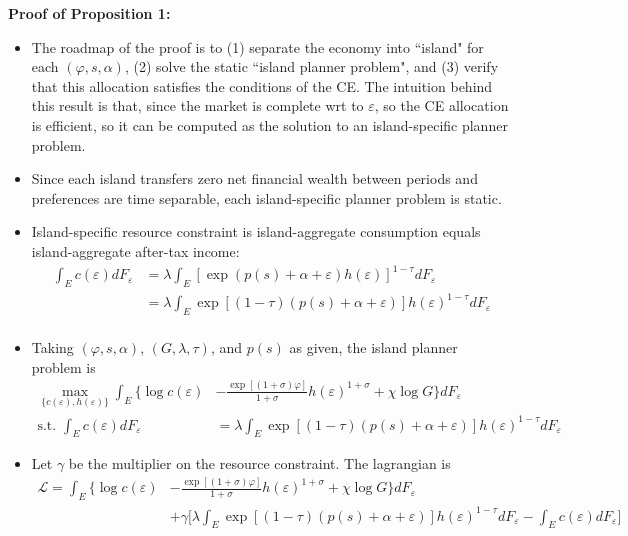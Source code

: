 \documentclass{article}
\newcommand{\Lfn}{\mathcal{L}}
\begin{document}
\bigskip



\textbf{Proof of Proposition 1:} 



\begin{itemize}
\item The roadmap of the proof is to (1) separate the economy into ``island" for each $(\varphi, s, \alpha)$, (2) solve the static ``island planner problem", and (3) verify that this allocation satisfies the conditions of the CE. The intuition behind this result is that, since the market is complete wrt to $\varepsilon$, so the CE allocation is efficient, so it can be computed as the solution to an island-specific planner problem. 
\item Since each island transfers zero net financial wealth between periods and preferences are time separable, each island-specific planner problem is static.
\item Island-specific resource constraint is island-aggregate consumption equals island-aggregate after-tax income:
\begin{align*}
\int_E c(\varepsilon) dF_\varepsilon 
&= \lambda \int_E [ \exp (p(s)+ \alpha + \varepsilon) h(\varepsilon)]^{1-\tau} dF_\varepsilon\\
&= \lambda \int_E \exp [(1-\tau)(p(s)+ \alpha + \varepsilon)] h(\varepsilon)^{1-\tau} dF_\varepsilon\\
\end{align*}
\item Taking $(\varphi, s, \alpha)$, $(G, \lambda, \tau)$, and $p(s)$ as given, the island planner problem is
\begin{align*}
\max_{\{c(\varepsilon), h(\varepsilon)\}} \int_E \Bigg\{ \log c(\varepsilon) &- \frac{\exp[(1+\sigma)\varphi]}{1 + \sigma} h(\varepsilon)^{1+\sigma} + \chi \log G \Bigg\} dF_\varepsilon\\
\text{s.t. } \int_E c(\varepsilon) dF_\varepsilon 
&= \lambda \int_E \exp [(1-\tau)(p(s)+ \alpha + \varepsilon)] h(\varepsilon)^{1-\tau} dF_\varepsilon
\end{align*}
\item Let $\gamma$ be the multiplier on the resource constraint. The lagrangian is
\begin{align*}
\Lfn = \int_E \Bigg\{ \log c(\varepsilon) &- \frac{\exp[(1+\sigma)\varphi]}{1 + \sigma} h(\varepsilon)^{1+\sigma} + \chi \log G \Bigg\} dF_\varepsilon \\
&+ \gamma \Bigg[\lambda \int_E \exp [(1-\tau)(p(s)+ \alpha + \varepsilon)] h(\varepsilon)^{1-\tau} dF_\varepsilon - \int_E c(\varepsilon) dF_\varepsilon \Bigg]

\end{align*}
\end{itemize}
\end{document}
